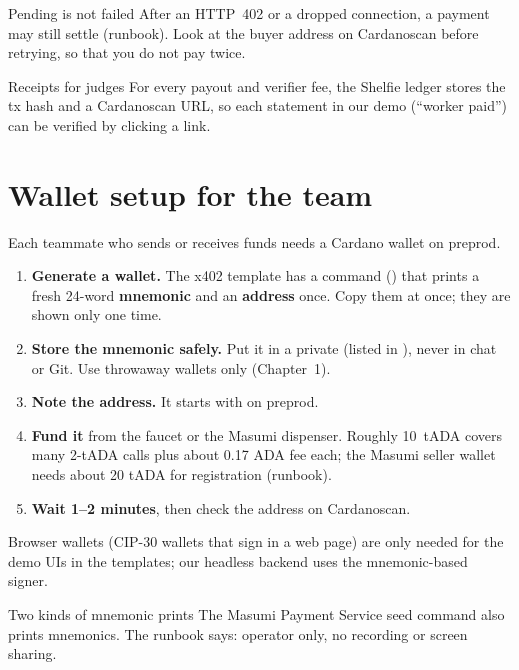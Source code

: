 \begin{warningbox}{Pending is not failed}
After an HTTP~402 or a dropped connection, a payment may still settle (runbook). Look at the buyer address on Cardanoscan before retrying, so that you do not pay twice.
\end{warningbox}

\begin{shelfiebox}{Receipts for judges}
For every payout and verifier fee, the Shelfie ledger stores the tx hash and a Cardanoscan URL, so each statement in our demo (``worker paid'') can be verified by clicking a link.
\end{shelfiebox}

\section{Wallet setup for the team}

Each teammate who sends or receives funds needs a Cardano wallet on preprod.

\begin{enumerate}
  \item \textbf{Generate a wallet.} The x402 template has a command () that prints a fresh 24-word \textbf{mnemonic} and an \textbf{address} once. Copy them at once; they are shown only one time.
  \item \textbf{Store the mnemonic safely.} Put it in a private  (listed in ), never in chat or Git. Use throwaway wallets only (Chapter~1).
  \item \textbf{Note the address.} It starts with  on preprod.
  \item \textbf{Fund it} from the faucet or the Masumi dispenser. Roughly 10~tADA covers many 2-tADA calls plus about 0.17 ADA fee each; the Masumi seller wallet needs about 20 tADA for registration (runbook).
  \item \textbf{Wait 1--2 minutes}, then check the address on Cardanoscan.
\end{enumerate}

Browser wallets (CIP-30 wallets that sign in a web page) are only needed for the demo UIs in the templates; our headless backend uses the mnemonic-based signer.

\begin{warningbox}{Two kinds of mnemonic prints}
The Masumi Payment Service seed command also prints mnemonics. The runbook says: operator only, no recording or screen sharing.
\end{warningbox}

